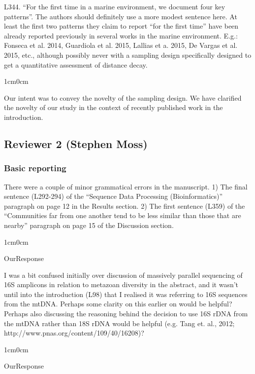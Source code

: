 \documentclass{article}
\newenvironment{response}
	{
	\begin{adjustwidth}{1cm}{0cm}
	\itshape %
	}
	{
	\end{adjustwidth}
	}
\begin{document}
L344. ``For the first time in a marine environment, we document four key patterns''. The authors should definitely use a more modest sentence here. At least the first two patterns they claim to report ``for the first time'' have been already reported previously in several works in the marine environment. E.g.: Fonseca et al. 2014, Guardiola et al. 2015, Lallias et a. 2015, De Vargas et al. 2015, etc., although possibly never with a sampling design specifically designed to get a quantitative assessment of distance decay.
\begin{response}
  Our intent was to convey the novelty of the sampling design. We have clarified the novelty of our study in the context of recently published work in the introduction.\\
\end{response}



\subsection*{Reviewer 2 (Stephen Moss)}
\subsubsection*{Basic reporting}
There were a couple of minor grammatical errors in the manuscript. 1) The final sentence (L292-294) of the ``Sequence Data Processing (Bioinformatics)'' paragraph on page 12 in the Results section. 2) The first sentence (L359) of the ``Communities far from one another tend to be less similar than those that are nearby'' paragraph on page 15 of the Discussion section.
\begin{response}
  OurResponse\\
\end{response}

I was a bit confused initially over discussion of massively parallel sequencing of 16S amplicons in relation to metazoan diversity in the abstract, and it wasn’t until into the introduction (L98) that I realised it was referring to 16S sequences from the mtDNA. Perhaps some clarity on this earlier on would be helpful? Perhaps also discussing the reasoning behind the decision to use 16S rDNA from the mtDNA rather than 18S rDNA would be helpful (e.g. Tang et. al., 2012; http://www.pnas.org/content/109/40/16208)?
\begin{response}
  OurResponse\\
\end{response}
\end{document}
